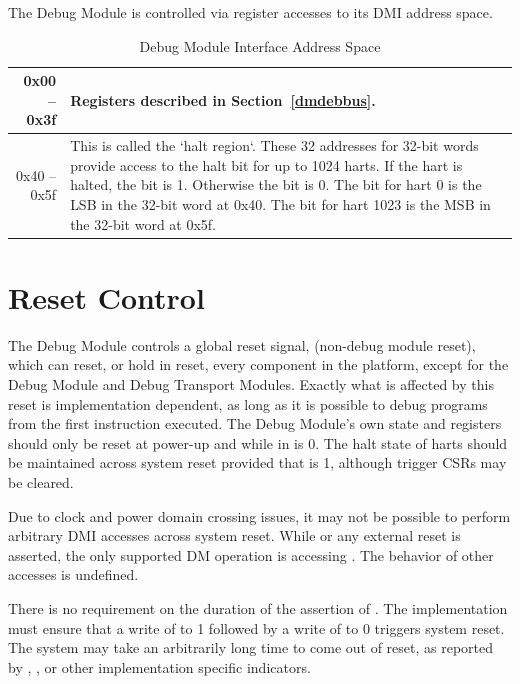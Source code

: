 The Debug Module is controlled via register accesses to its DMI address space.

\begin{table}[htp]
    \centering
    \caption{Debug Module Interface Address Space}
    \label{tab:header}
    \begin{tabulary}{\textwidth}{|r|L|}
        \hline
        0x00 -- 0x3f & Registers described in Section~\ref{dmdebbus}. \\
        \hline
        0x40 -- 0x5f & This is called the `halt region`.  These 32 addresses
        for 32-bit words provide access to the halt bit for up to 1024 harts.
        If the hart is halted, the bit is 1.  Otherwise
        the bit is 0. The bit for hart 0 is the LSB in the 32-bit word at 0x40.
        The bit for hart 1023 is the MSB in the 32-bit word at 0x5f. \\
        \hline
    \end{tabulary}
\end{table}

\section{Reset Control} \label{reset}

The Debug Module controls a global reset signal, \Fndmreset
(non-debug module reset),
which can reset, or hold in reset, every component in the platform,
except for the Debug Module and Debug Transport Modules.
Exactly what is affected by this reset is implementation dependent, as long as
it is possible to debug programs from the first instruction executed.
The Debug Module's own state and registers should only be
reset at power-up and while
\Fdmactive in \Rdmcontrol is 0.
The halt state of harts should be
maintained across system reset provided that \Fdmactive is 1,
although trigger CSRs may be cleared.

Due to clock and power domain crossing issues,
it may not be possible to perform arbitrary DMI accesses across
system reset.
While \Fndmreset or any external reset is asserted, the only supported DM
operation is accessing \Rdmcontrol. The behavior of other accesses is
undefined.

There is no requirement on the duration of the assertion of \Fndmreset.
The implementation must ensure that a write of \Fndmreset to 1 followed by
a write of \Fndmreset to 0 triggers system reset. The system may take
an arbitrarily long time to come out of reset, as reported by \Fallunavail,
\Fanyunavail, or other implementation specific indicators.

